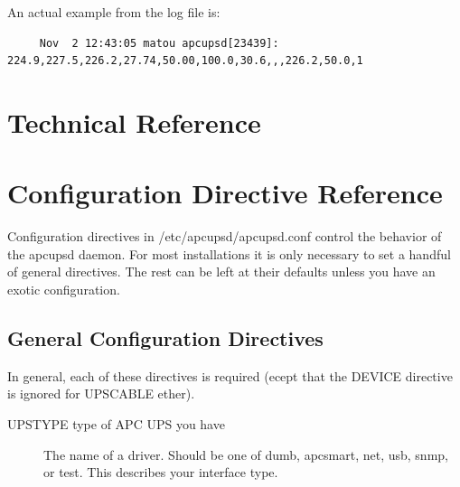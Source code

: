 {{{{{{{{{An actual example from the log file is: 

\footnotesize
\begin{verbatim}
     Nov  2 12:43:05 matou apcupsd[23439]: 224.9,227.5,226.2,27.74,50.00,100.0,30.6,,,226.2,50.0,1
\end{verbatim}
\normalsize

\label{Technical-Reference}

\section*{Technical Reference}

\label{index-Technical-Reference-235}

\label{Configuration-Directive-Reference}

\section*{Configuration Directive Reference}

\label{index-Reference_002c-Directives-236}
\label{index-Configuration_002c-Directives-237}
\label{index-Directives-238}
Configuration directives in /etc/apcupsd/apcupsd.conf control the behavior of
the apcupsd daemon.  For most installations it is only necessary to set a
handful of general directives. The rest can be left at their defaults unless
you have an exotic configuration. 

\label{General-Configuration-Directives}

\subsection*{General Configuration Directives}

\label{index-Directives_002c-General-239}
\label{index-General-Directives-240}
In general, each of these directives is required (ecept that the DEVICE
directive is ignored for UPSCABLE ether).  

\begin{description}

\item [UPSTYPE \lt{}type of APC UPS you have\gt{}]
   The name of a driver.  Should be one of dumb, apcsmart, net, usb, snmp, or
test. This describes your interface type.  


\end{description}}}}}}}}}}
